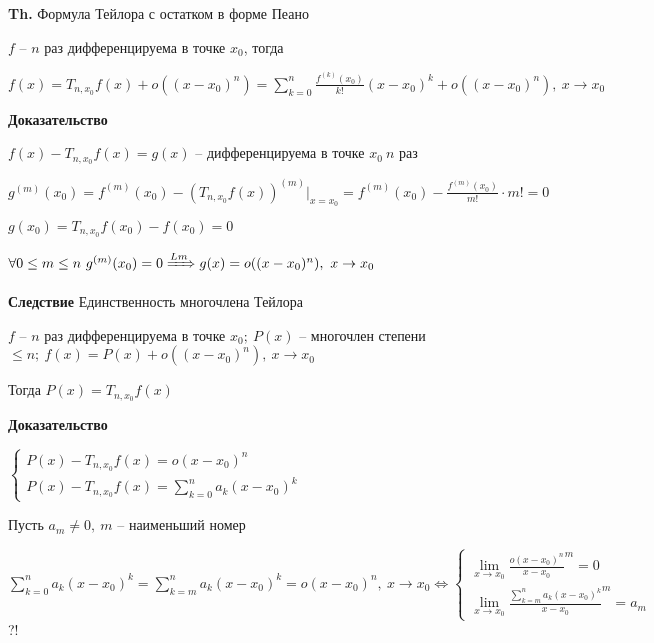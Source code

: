 \documentclass[14pt, letter paper]{article}
\begin{document}
\vspace{5mm}

\textbf{Th.} Формула Тейлора с остатком в форме Пеано 

$f$ -- $n$ раз дифференцируема в точке $x_0$, тогда

$f(x) = T_{n, x_0}f(x) + o((x - x_0)^n) = \sum\limits_{k = 0}^n \frac{f^{(k)}(x_0)}{k!}(x - x_0)^k + o((x - x_0)^n),\ x \rightarrow x_0$

\begin{center}
    \textbf{Доказательство}
\end{center}

$f(x) - T_{n, x_0}f(x) = g(x)$ -- дифференцируема в точке $x_0\ n$ раз

$g^{(m)}(x_0) = f^{(m)}(x_0) - (T_{n, x_0}f(x))^{(m)}|_{x = x_0} = f^{(m)}(x_0) - \frac{f^{(m)}(x_0)}{m!} \cdot m! = 0$

$g(x_0) = T_{n, x_0}f(x_0) - f(x_0) = 0$

$\forall 0 \leq m \leq n\ g^{(m)}(x_0) = 0 \xRightarrow{Lm} g(x) = o((x - x_0)^n),\ x \rightarrow x_0$

\vspace{5mm}

\textbf{Следствие} Единственность многочлена Тейлора

$f$ -- $n$ раз дифференцируема в точке $x_0;\ P(x)$ -- многочлен степени $\leq n;\ f(x) = P(x) + o((x - x_0)^n),\ x \rightarrow x_0$

Тогда $P(x) = T_{n, x_0}f(x)$

\begin{center}
    \textbf{Доказательство}
\end{center}

$\begin{cases}
    P(x) - T_{n, x_0}f(x) = o(x - x_0)^n \\
    P(x) - T_{n, x_0}f(x) = \sum\limits_{k = 0}^n a_k(x - x_0)^k
\end{cases}$

Пусть $a_m \neq 0,\ m$ -- наименьший номер

$\sum\limits_{k = 0}^n a_k(x - x_0)^k = \sum\limits_{k = m}^n a_k(x - x_0)^k = o(x - x_0)^n,\ x \rightarrow x_0 \Leftrightarrow \begin{cases}
    \lim\limits_{x \rightarrow x_0} \frac{o(x - x_0)^n}{x - x_0}^m = 0 \\
    \lim\limits_{x \rightarrow x_0} \frac{\sum\limits_{k = m}^n a_k(x - x_0)^k}{x - x_0}^m = a_m
\end{cases}$ ?!
\end{document}
